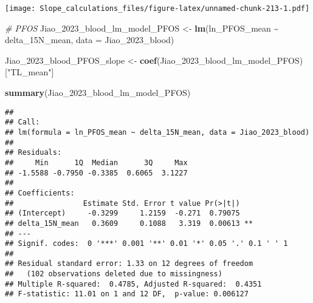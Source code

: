 \documentclass[
]{article}
\newenvironment{Shaded}{\begin{snugshade}}{\end{snugshade}}
\newcommand{\AttributeTok}[1]{\textcolor[rgb]{0.13,0.29,0.53}{#1}}
\newcommand{\CommentTok}[1]{\textcolor[rgb]{0.56,0.35,0.01}{\textit{#1}}}
\newcommand{\FunctionTok}[1]{\textcolor[rgb]{0.13,0.29,0.53}{\textbf{#1}}}
\newcommand{\NormalTok}[1]{#1}
\newcommand{\OtherTok}[1]{\textcolor[rgb]{0.56,0.35,0.01}{#1}}
\newcommand{\SpecialCharTok}[1]{\textcolor[rgb]{0.81,0.36,0.00}{\textbf{#1}}}
\newcommand{\StringTok}[1]{\textcolor[rgb]{0.31,0.60,0.02}{#1}}
\begin{document}
\texttt{[image: Slope\_calculations\_files/figure-latex/unnamed-chunk-213-1.pdf]}

\begin{Shaded}
\begin{Highlighting}[]
\CommentTok{\# PFOS}
\NormalTok{Jiao\_2023\_blood\_lm\_model\_PFOS }\OtherTok{\textless{}{-}} \FunctionTok{lm}\NormalTok{(ln\_PFOS\_mean }\SpecialCharTok{\textasciitilde{}}\NormalTok{ delta\_15N\_mean,}
                                    \AttributeTok{data =}\NormalTok{ Jiao\_2023\_blood)}

\NormalTok{Jiao\_2023\_blood\_PFOS\_slope }\OtherTok{\textless{}{-}} \FunctionTok{coef}\NormalTok{(Jiao\_2023\_blood\_lm\_model\_PFOS)[}\StringTok{"TL\_mean"}\NormalTok{]}

\FunctionTok{summary}\NormalTok{(Jiao\_2023\_blood\_lm\_model\_PFOS)}
\end{Highlighting}
\end{Shaded}

\begin{verbatim}
## 
## Call:
## lm(formula = ln_PFOS_mean ~ delta_15N_mean, data = Jiao_2023_blood)
## 
## Residuals:
##     Min      1Q  Median      3Q     Max 
## -1.5588 -0.7950 -0.3385  0.6065  3.1227 
## 
## Coefficients:
##                Estimate Std. Error t value Pr(>|t|)   
## (Intercept)     -0.3299     1.2159  -0.271  0.79075   
## delta_15N_mean   0.3609     0.1088   3.319  0.00613 **
## ---
## Signif. codes:  0 '***' 0.001 '**' 0.01 '*' 0.05 '.' 0.1 ' ' 1
## 
## Residual standard error: 1.33 on 12 degrees of freedom
##   (102 observations deleted due to missingness)
## Multiple R-squared:  0.4785, Adjusted R-squared:  0.4351 
## F-statistic: 11.01 on 1 and 12 DF,  p-value: 0.006127
\end{verbatim}
\end{document}
